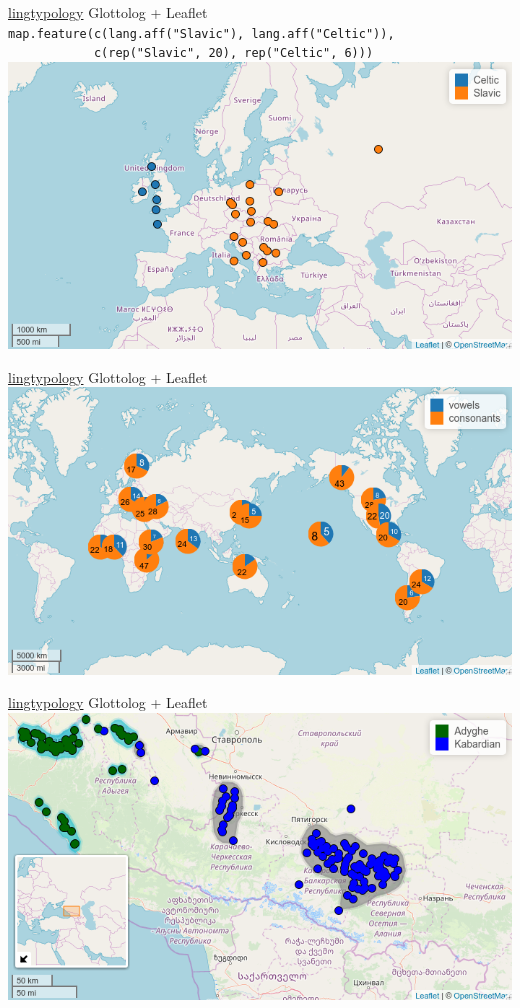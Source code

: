 \documentclass[13pt, t, aspectratio=169]{beamer}
\begin{document}
\begin{frame}{\href{https://ropensci.github.io/lingtypology/}{lingtypology}}
\alert{\large Glottolog + Leaflet}\\
\vfill
\texttt{\small  map.feature(c(lang.aff("Slavic"), lang.aff("Celtic")),}\\
\texttt{\small \ \ \ \ \ \ \ \ \ \ \ \ c(rep("Slavic"{}, 20), rep("Celtic"{}, 6)))}\\
\includegraphics[width=0.75\linewidth]{images/03-colored}
\end{frame}

\begin{frame}{\href{https://ropensci.github.io/lingtypology/}{lingtypology}}
\alert{\large Glottolog + Leaflet}\\
\vfill
\includegraphics[width=0.8\linewidth]{images/04-minicharts}
\end{frame}

\begin{frame}{\href{https://ropensci.github.io/lingtypology/}{lingtypology}}
\alert{\large Glottolog + Leaflet}\\
\vfill
\includegraphics[width=0.8\linewidth]{images/05-density}
\end{frame}
\end{document}

